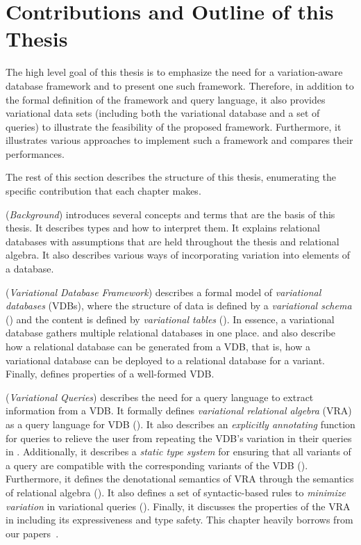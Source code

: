 \section{Contributions and Outline of this Thesis}
\label{sec:contribution}

The high level goal of this thesis is to emphasize the need for a variation-aware database
framework and to present one such framework. Therefore, in addition to the formal 
definition of the framework and query language, it also provides variational data sets 
(including both the variational database and a set of queries) to illustrate the feasibility
of the proposed framework. Furthermore, it illustrates various approaches to implement
such a framework and compares their performances.

The rest of this section describes the structure of this thesis, enumerating the specific 
contribution that each chapter makes. 

 (\emph{Background}) introduces several concepts and terms that are the 
basis of this thesis. It describes types and how to interpret them. It explains relational
databases with assumptions that are held throughout the thesis and relational algebra. 
It also describes various ways of incorporating variation
into elements of a database. 

 (\emph{Variational Database Framework}) describes a formal model of
\emph{variational databases} (VDBs), where the structure of data
is defined by a \emph{variational schema} () and the content is defined
by \emph{variational tables} ().
In essence, a variational database gathers multiple relational databases in one place.
 and  also describe how a relational database can be generated
from a VDB, that is, how a variational database can be deployed to a relational database for a variant.
Finally,  defines properties of a well-formed VDB.

 (\emph{Variational Queries}) describes the need for a query language 
to extract information from a VDB. It formally defines 
\emph{variational relational algebra} (VRA) as a query language for
VDB ().
%
It also describes an \emph{explicitly annotating}  function for queries to relieve the 
user from repeating the VDB's variation in their queries in .
%
Additionally, it describes a \emph{static type system} for ensuring that all variants of a query are
compatible with the corresponding variants of the VDB ().
% 
Furthermore, it defines the denotational semantics of VRA through the semantics of
relational algebra ().
%
It also defines a set of syntactic-based rules to \emph{minimize variation} in 
variational queries ().
%
Finally, it discusses the properties of the VRA in  including its expressiveness and 
type safety. 
%
This chapter heavily borrows from our papers~\cite{ATW17dbpl, ATW18poly, vldbArXiv}.

